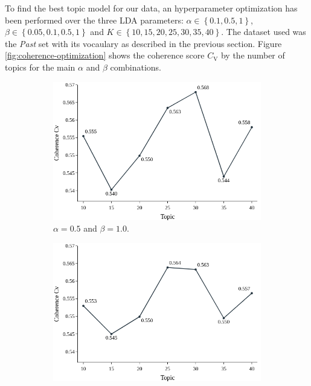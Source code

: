 To find the best topic model for our data, an hyperparameter optimization has been performed over the three LDA parameters: $\alpha \in \left\{0.1, 0.5, 1\right\}$, $\beta \in \left\{0.05, 0.1, 0.5, 1\right\}$ and $K \in \left\{10, 15, 20, 25, 30, 35, 40\right\}$. The dataset used was the \textit{Past} set with its vocaulary as described in the previous section. Figure \ref{fig:coherence-optimization} shows the coherence score $C_{\text{V}}$ by the number of topics for the main $\alpha$ and $\beta$ combinations.

\begin{figure}[h!]
	\begin{subfigure}{0.49\textwidth}
		\includegraphics[width=\linewidth]{01.Chapters/05.Results/01_Topic_Cv_A:0.5| B:1.00}
		\caption{$\alpha = 0.5$ and $\beta = 1.0$.}
	\end{subfigure}%
	\hfill
	\begin{subfigure}{0.49\textwidth}
		\includegraphics[width=\linewidth]{01.Chapters/05.Results/02_Topic_Cv_A:0.1| B:1.00}

\end{subfigure}
\end{figure}
